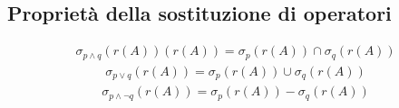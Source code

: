 \subsection{Proprietà della sostituzione di operatori}
    \begin{equation}\begin{aligned}
        \sigma_{p \wedge q} (r(A))(r(A))= 
        \sigma_p (r(A)) \cap \sigma_q (r(A))
    \end{aligned}\end{equation}
    \begin{equation}\begin{aligned}
        \sigma_{p \vee q} (r(A))= 
        \sigma_p (r(A)) \cup \sigma_q (r(A))
    \end{aligned}\end{equation}
    \begin{equation}\begin{aligned}
        \sigma_{p \wedge \neg q} (r(A))= 
        \sigma_p (r(A)) - \sigma_q (r(A))
    \end{aligned}\end{equation}
    
